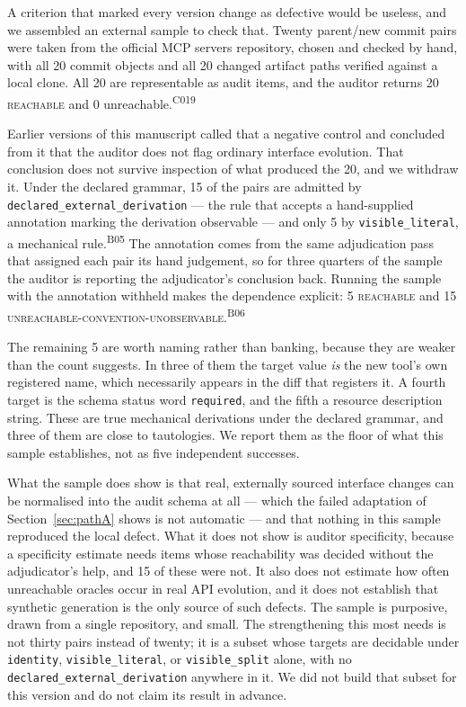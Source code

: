 \documentclass[11pt]{article}
\newcommand{\ledger}[1]{\textsuperscript{\textsf{\scriptsize #1}}}
\newcommand{\st}[1]{\textsc{\small #1}}
\begin{document}
A criterion that marked every version change as defective would be useless, and
we assembled an external sample to check that. Twenty parent/new commit pairs
were taken from the official MCP servers repository, chosen and checked by
hand, with all 20 commit objects and all 20 changed artifact paths verified
against a local clone. All 20 are representable as audit items, and the auditor
returns 20 \st{reachable} and 0 unreachable.\ledger{C019}

Earlier versions of this manuscript called that a negative control and
concluded from it that the auditor does not flag ordinary interface evolution.
That conclusion does not survive inspection of what produced the 20, and we
withdraw it. Under the declared grammar, 15 of the pairs are admitted by
\texttt{declared\_external\_derivation} --- the rule that accepts a
hand-supplied annotation marking the derivation observable --- and only 5 by
\texttt{visible\_literal}, a mechanical rule.\ledger{B05} The annotation comes
from the same adjudication pass that assigned each pair its hand judgement, so
for three quarters of the sample the auditor is reporting the adjudicator's
conclusion back. Running the sample with the annotation withheld makes the
dependence explicit: 5 \st{reachable} and 15
\st{unreachable-convention-unobservable}.\ledger{B06}

The remaining 5 are worth naming rather than banking, because they are weaker
than the count suggests. In three of them the target value \emph{is} the new
tool's own registered name, which necessarily appears in the diff that registers
it. A fourth target is the schema status word \texttt{required}, and the fifth a
resource description string. These are true mechanical derivations under the
declared grammar, and three of them are close to tautologies. We report them as
the floor of what this sample establishes, not as five independent successes.

What the sample does show is that real, externally sourced interface changes
can be normalised into the audit schema at all --- which the failed adaptation
of Section~\ref{sec:pathA} shows is not automatic --- and that nothing in this
sample reproduced the local defect. What it does not show is auditor
specificity, because a specificity estimate needs items whose reachability was
decided without the adjudicator's help, and 15 of these were not. It also does
not estimate how often unreachable oracles occur in real API evolution, and it
does not establish that synthetic generation is the only source of such
defects. The sample is purposive, drawn from a single repository, and small.
The strengthening this most needs is not thirty pairs instead of twenty; it is
a subset whose targets are decidable under \texttt{identity},
\texttt{visible\_literal}, or \texttt{visible\_split} alone, with no
\texttt{declared\_external\_derivation} anywhere in it. We did not build that
subset for this version and do not claim its result in advance.
\end{document}
